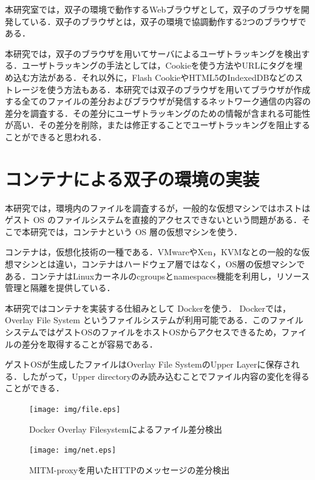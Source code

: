 \documentclass[submit]{ipsj}
\begin{document}
本研究室では，双子の環境で動作するWebブラウザとして，双子のブラウザを開発している\cite{comsys}．双子のブラウザとは，双子の環境で協調動作する2つのブラウザである．

本研究では，双子のブラウザを用いてサーバによるユーザトラッキングを検出する．ユーザトラッキングの手法としては，Cookieを使う方法やURLにタグを埋め込む方法がある．それ以外に，Flash CookieやHTML5のIndexedDBなどのストレージを使う方法もある．本研究では双子のブラウザを用いてブラウザが作成する全てのファイルの差分およびブラウザが発信するネットワーク通信の内容の差分を調査する．その差分にユーザトラッキングのための情報が含まれる可能性が高い．その差分を削除，または修正することでユーザトラッキングを阻止することができると思われる．




\section{コンテナによる双子の環境の実装}
本研究では，環境内のファイルを調査するが，一般的な仮想マシンではホストはゲスト OS のファイルシステムを直接的アクセスできないという問題がある．そこで本研究では，コンテナという OS 層の仮想マシンを使う．

コンテナは，仮想化技術の一種である．VMwareやXen，KVMなとの一般的な仮想マシンとは違い，コンテナはハードウェア層ではなく，OS層の仮想マシンである．コンテナはLinuxカーネルのcgroupsとnamespaces機能を利用し，リソース管理と隔離を提供している．


本研究ではコンテナを実装する仕組みとして Dockerを使う． Dockerでは， Overlay File System というファイルシステムが利用可能である．このファイルシステムではゲストOSのファイルをホストOSからアクセスできるため，ファイルの差分を取得することが容易である．

ゲストOSが生成したファイルはOverlay File SystemのUpper Layerに保存される．したがって，Upper directoryのみ読み込むことでファイル内容の変化を得ることができる．




\begin{figure}[ht]
\begin{center}
\texttt{[image: img/file.eps]}
\caption{Docker Overlay Filesystemによるファイル差分検出}
\label{figure:file}
\end{center}
\end{figure}

\begin{figure}[ht]
\begin{center}
\texttt{[image: img/net.eps]}
\caption{MITM-proxyを用いたHTTPのメッセージの差分検出}
\label{figure:network}
\end{center}
\end{figure}
\end{document}
